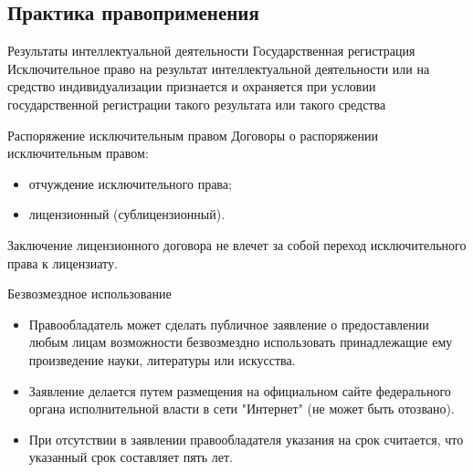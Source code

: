 \documentclass[_Venture_p2.tex]{subfiles}
\begin{document}
\subsection{Практика правоприменения}
\begin{frame}{Результаты интеллектуальной деятельности }{Государственная регистрация }
Исключительное право на результат интеллектуальной деятельности или на средство индивидуализации признается и охраняется при условии государственной регистрации такого результата или такого средства
\end{frame}

\begin{frame}{Распоряжение исключительным правом}
Договоры о распоряжении исключительным правом:
\begin{itemize}
	\item отчуждение исключительного права;
	\item лицензионный (сублицензионный).
\end{itemize}
Заключение лицензионного договора не влечет за собой переход исключительного права к лицензиату.
\end{frame}

\begin{frame}[shrink=15]{Безвозмездное использование}
\begin{itemize}
	\item Правообладатель может сделать публичное заявление о предоставлении любым лицам возможности безвозмездно использовать принадлежащие ему произведение науки, литературы или искусства.
	
	\item Заявление делается путем размещения на официальном сайте федерального органа исполнительной власти в сети "Интернет" (не может быть отозвано).
	  	
	\item При отсутствии в заявлении правообладателя указания на срок считается, что указанный срок составляет пять лет.
\end{itemize}
\end{frame}
\end{document}
